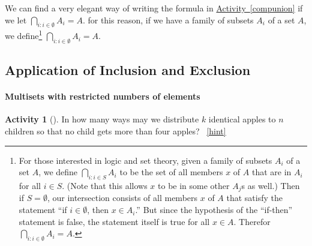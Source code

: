 \documentclass[10pt,]{book}
\theoremstyle{plain}
\theoremstyle{definition}
\theoremstyle{definition}
\theoremstyle{definition}
\newtheorem{activity}[project]{Activity}
\numberwithin{equation}{chapter}
\begin{document}
We can find a very elegant way of writing the formula in \hyperref[compunion]{Activity~\ref{compunion}} if we let \(\bigcap_{i:i\in\emptyset}A_i = A\).  for this reason, if we have a family of subsets \(A_i\) of a set \(A\), we define\footnote{For those interested in logic and set theory, given a family of subsets \(A_i\) of a set \(A\), we define \(\bigcap_{i:i\in S}A_i\) to be the set of all members \(x\) of \(A\) that are in \(A_i\) for all \(i \in S\).  (Note that this allows \(x\) to be in some other \(A_j\)s as well.)  Then if \(S = \emptyset\), our intersection consists of all members \(x\) of \(A\) that satisfy the statement ``if \(i\in \emptyset\), then \(x \in A_i\).'' But since the hypothesis of the ``if-then'' statement is false, the statement itself is true for all \(x \in A\).  Therefor \(\bigcap_{i:i \in \emptyset}A_i = A\).\label{fn-12}} \(\bigcap_{i:i\in\emptyset}A_i = A\).%
\typeout{************************************************}
\typeout{************************************************}
\subsection[{Application of Inclusion and Exclusion}]{Application of Inclusion and Exclusion}\label{subsection-29}
\typeout{************************************************}
\typeout{************************************************}
\paragraph[{Multisets with restricted numbers of elements}]{Multisets with restricted numbers of elements}\hypertarget{paragraphs-4}{}
\begin{activity}[]\label{act_restrictedmultisetspie}
\hypertarget{p-1208}{}%
In how many ways may we distribute \(k\) identical apples to \(n\) children so that no child gets more than four apples?%
~\hfill{\tiny\hyperlink{a-225}{[hint]}\hypertarget{q-225}{}}\end{activity}
\typeout{************************************************}
\typeout{************************************************}
\end{document}
